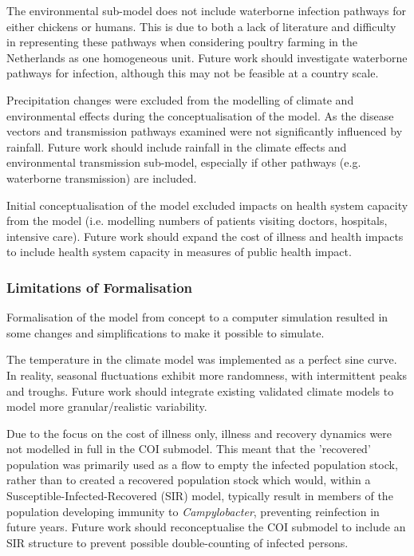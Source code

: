 The environmental sub-model does not include waterborne infection pathways for either chickens or humans. This is due to both a lack of literature and difficulty in representing these pathways when considering poultry farming in the Netherlands as one homogeneous unit. Future work should investigate waterborne pathways for infection, although this may not be feasible at a country scale.

Precipitation changes were excluded from the modelling of climate and environmental effects during the conceptualisation of the model. As the disease vectors and transmission pathways examined were not significantly influenced by rainfall. Future work should include rainfall in the climate effects and environmental transmission sub-model, especially if other pathways (e.g. waterborne transmission) are included.

Initial conceptualisation of the model excluded impacts on health system capacity from the model (i.e. modelling numbers of patients visiting doctors, hospitals, intensive care). Future work should expand the cost of illness and health impacts to include health system capacity in measures of public health impact.

\subsubsection{Limitations of Formalisation}
Formalisation of the model from concept to a computer simulation resulted in some changes and simplifications to make it possible to simulate.

The temperature in the climate model was implemented as a perfect sine curve. In reality, seasonal fluctuations exhibit more randomness, with intermittent peaks and troughs. Future work should integrate existing validated climate models to model more granular/realistic variability.

Due to the focus on the cost of illness only, illness and recovery dynamics were not modelled in full in the COI submodel. This meant that the 'recovered' population was primarily used as a flow to empty the infected population stock, rather than to created a recovered population stock which would, within a Susceptible-Infected-Recovered (SIR) model, typically result in members of the population developing immunity to \textit{Campylobacter}, preventing reinfection in future years. Future work should reconceptualise the COI submodel to include an SIR structure to prevent possible double-counting of infected persons.

